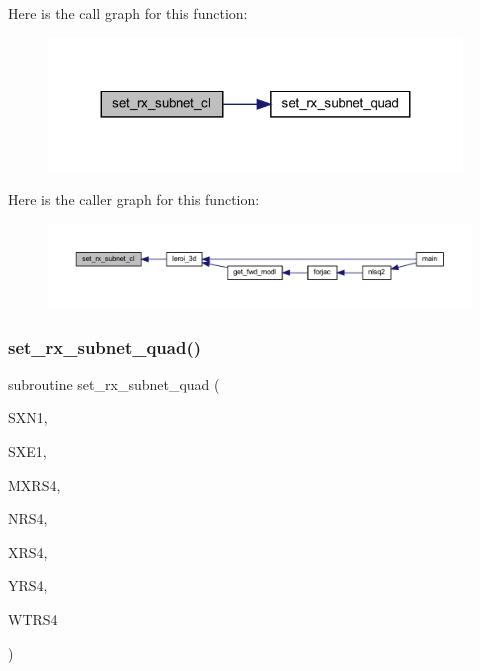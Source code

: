 Here is the call graph for this function\+:\nopagebreak
\begin{figure}[H]
\begin{center}
\leavevmode
\includegraphics[width=311pt]{Leroi_8f90_a805e33739aa8ba4bfe42148473309ce0_cgraph}
\end{center}
\end{figure}
Here is the caller graph for this function\+:\nopagebreak
\begin{figure}[H]
\begin{center}
\leavevmode
\includegraphics[width=350pt]{Leroi_8f90_a805e33739aa8ba4bfe42148473309ce0_icgraph}
\end{center}
\end{figure}
\mbox{\label{Leroi_8f90_a397597f84bff232d8a1a2f4a44e6e75f}} 
\subsubsection{\texorpdfstring{set\+\_\+rx\+\_\+subnet\+\_\+quad()}{set\_rx\_subnet\_quad()}}
{\footnotesize\ttfamily subroutine set\+\_\+rx\+\_\+subnet\+\_\+quad (\begin{DoxyParamCaption}\item[{real, dimension(4)}]{S\+X\+N1,  }\item[{real, dimension(4)}]{S\+X\+E1,  }\item[{integer}]{M\+X\+R\+S4,  }\item[{integer}]{N\+R\+S4,  }\item[{real, dimension(mxrs4)}]{X\+R\+S4,  }\item[{real, dimension(mxrs4)}]{Y\+R\+S4,  }\item[{real}]{W\+T\+R\+S4 }\end{DoxyParamCaption})}

